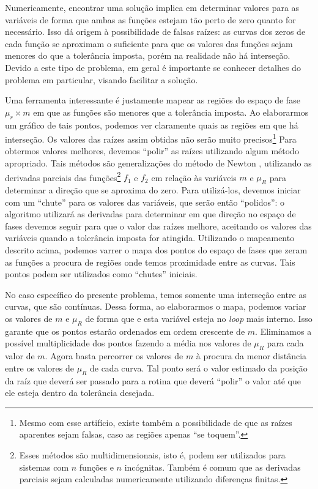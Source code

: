 Numericamente, encontrar uma solução implica em determinar valores para as variáveis de forma que ambas as funções estejam tão perto de zero quanto for necessário. Isso dá origem à possibilidade de falsas raízes: as curvas dos zeros de cada função se aproximam o suficiente para que os valores das funções sejam menores do que a tolerância imposta, porém na realidade não há interseção. Devido a este tipo de problema, em geral é importante se conhecer detalhes do problema em particular, visando facilitar a solução.

Uma ferramenta interessante é justamente mapear as regiões do espaço de fase $\mu_r \times m$ em que as funções são menores que a tolerância imposta. Ao elaborarmos um gráfico de tais pontos, podemos ver claramente quais as regiões em que há interseção. Os valores das raízes assim obtidas não serão muito precisos\footnote{Mesmo com esse artifício, existe também a possibilidade de que as raízes aparentes sejam falsas, caso as regiões apenas ``se toquem''.} Para obtermos valores melhores, devemos ``polir'' as raízes utilizando algum método apropriado. Tais métodos são generalizações do método de Newton \parencite{NumericalRecipes}, utilizando as derivadas parciais das funções\footnote{Esses métodos são multidimensionais, isto é, podem ser utilizados para sistemas com $n$ funções e $n$ incógnitas. Também é comum que as derivadas parciais sejam calculadas numericamente utilizando diferenças finitas.} $f_1$ e $f_2$ em relação às variáveis $m$ e $\mu_R$ para determinar a direção que se aproxima do zero. Para utilizá-los, devemos iniciar com um ``chute'' para os valores das variáveis, que serão então ``polidos'': o algoritmo utilizará as derivadas para determinar em que direção no espaço de fases devemos seguir para que o valor das raízes melhore, aceitando os valores das variáveis quando a tolerância imposta for atingida. Utilizando o mapeamento descrito acima, podemos varrer o mapa dos pontos do espaço de fases que zeram as funções a procura de regiões onde temos proximidade entre as curvas. Tais pontos podem ser utilizados como ``chutes'' iniciais.

No caso específico do presente problema, temos somente uma interseção entre as curvas, que são contínuas. Dessa forma, ao elaborarmos o mapa, podemos variar os valores de $m$ e $\mu_R$ de forma que e esta variável esteja no \emph{loop} mais interno. Isso garante que os pontos estarão ordenados em ordem crescente de $m$. Eliminamos a possível multiplicidade dos pontos fazendo a média nos valores de $\mu_R$ para cada valor de $m$. Agora basta percorrer os valores de $m$ à procura da menor distância entre os valores de $\mu_R$ de cada curva. Tal ponto será o valor estimado da posição da raíz que deverá ser passado para a rotina que deverá ``polir'' o valor até que ele esteja dentro da tolerância desejada.

